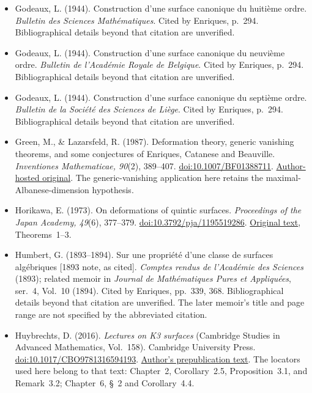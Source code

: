 \begin{sloppypar}
\begin{itemize}
\item Godeaux, L. (1944). Construction d'une surface canonique du huitième ordre. \emph{Bulletin des Sciences Mathématiques}. Cited by Enriques, p.~294. Bibliographical details beyond that citation are unverified.

\item Godeaux, L. (1944). Construction d'une surface canonique du neuvième ordre. \emph{Bulletin de l'Académie Royale de Belgique}. Cited by Enriques, p.~294. Bibliographical details beyond that citation are unverified.

\item Godeaux, L. (1944). Construction d'une surface canonique du septième ordre. \emph{Bulletin de la Société des Sciences de Liège}. Cited by Enriques, p.~294. Bibliographical details beyond that citation are unverified.

\item Green, M., \& Lazarsfeld, R. (1987). Deformation theory, generic vanishing theorems, and some conjectures of Enriques, Catanese and Beauville. \emph{Inventiones Mathematicae, 90}(2), 389--407. \href{https://doi.org/10.1007/BF01388711}{doi:10.1007/BF01388711}. \href{https://www.math.stonybrook.edu/robert.lazarsfeld/Reprints/Green.Laz.GVT.pdf}{Author-hosted original}. The generic-vanishing application here retains the maximal-Albanese-dimension hypothesis.

\item Horikawa, E. (1973). On deformations of quintic surfaces. \emph{Proceedings of the Japan Academy, 49}(6), 377--379. \href{https://doi.org/10.3792/pja/1195519286}{doi:10.3792/pja/1195519286}. \href{https://www.jstage.jst.go.jp/article/pjab1945/49/6/49_6_377/_pdf}{Original text}, Theorems~1--3.

\item Humbert, G. (1893--1894). Sur une propriété d'une classe de surfaces algébriques [1893 note, as cited]. \emph{Comptes rendus de l'Académie des Sciences} (1893); related memoir in \emph{Journal de Mathématiques Pures et Appliquées}, ser.~4, Vol.~10 (1894). Cited by Enriques, pp.~339, 368. Bibliographical details beyond that citation are unverified. The later memoir's title and page range are not specified by the abbreviated citation.

\item Huybrechts, D. (2016). \emph{Lectures on K3 surfaces} (Cambridge Studies in Advanced Mathematics, Vol.~158). Cambridge University Press. \href{https://doi.org/10.1017/CBO9781316594193}{doi:10.1017/CBO9781316594193}. \href{https://www.math.uni-bonn.de/people/huybrech/K3Global.pdf}{Author's prepublication text}. The locators used here belong to that text: Chapter~2, Corollary~2.5, Proposition~3.1, and Remark~3.2; Chapter~6, \S~2 and Corollary~4.4.


\end{itemize}
\end{sloppypar}
